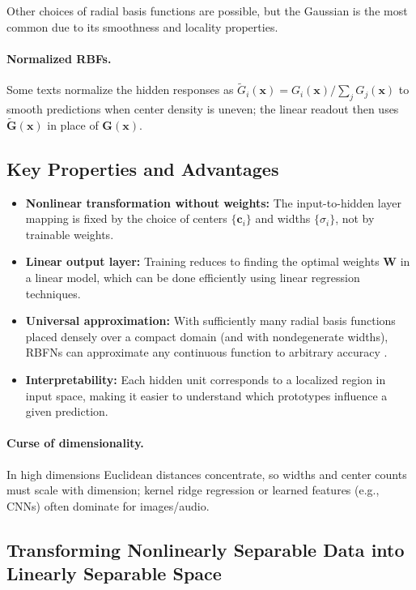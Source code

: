 Other choices of radial basis functions are possible, but the Gaussian is the most common due to its smoothness and locality properties.

\paragraph{Normalized RBFs.} Some texts normalize the hidden responses as \(\tilde{G}_i(\mathbf{x}) = G_i(\mathbf{x})/\sum_j G_j(\mathbf{x})\) to smooth predictions when center density is uneven; the linear readout then uses \(\tilde{\mathbf{G}}(\mathbf{x})\) in place of \(\mathbf{G}(\mathbf{x})\).

\subsection{Key Properties and Advantages}
\label{sec:rbf_key_properties_and_advantages}

\begin{itemize}
    \item \textbf{Nonlinear transformation without weights:} The input-to-hidden layer mapping is fixed by the choice of centers \(\{\mathbf{c}_i\}\) and widths \(\{\sigma_i\}\), not by trainable weights.
    \item \textbf{Linear output layer:} Training reduces to finding the optimal weights \(\mathbf{W}\) in a linear model, which can be done efficiently using linear regression techniques.
\item \textbf{Universal approximation:} With sufficiently many radial basis functions placed densely over a compact domain (and with nondegenerate widths), RBFNs can approximate any continuous function to arbitrary accuracy \citep{ParkSandberg1991,Micchelli1986}.
\item \textbf{Interpretability:} Each hidden unit corresponds to a localized region in input space, making it easier to understand which prototypes influence a given prediction.
\end{itemize}
\paragraph{Curse of dimensionality.} In high dimensions Euclidean distances concentrate, so widths and center counts must scale with dimension; kernel ridge regression or learned features (e.g., CNNs) often dominate for images/audio.


\subsection{Transforming Nonlinearly Separable Data into Linearly Separable Space}
\label{sec:rbf_transforming_nonlinearly_separable_data_into_linearly_separable_space}

